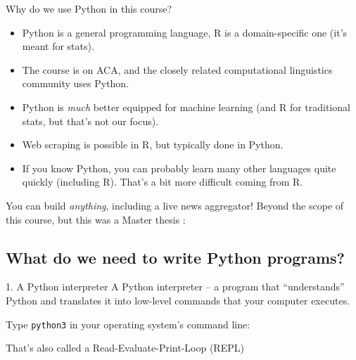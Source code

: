 \begin{frame}{Why do we use Python in this course?}
\begin{itemize}
	\item Python is a general programming language, R is a domain-specific one (it's meant for stats).
	\item The course is on ACA, and the closely related computational linguistics community uses Python.
	\item Python is \emph{much} better equipped for machine learning (and R for traditional stats, but that's not our focus).
	\item Web scraping is possible in R, but typically done in Python.
	\item If you know Python, you can probably learn many other languages quite quickly (including R). That's a bit more difficult coming from R.
\end{itemize}
	
\end{frame}



\begin{frame}{You can build \emph{anything}, including a live news aggregator!} 
	Beyond the scope of this course, but this was a Master thesis \parencite{3bij3}:
\end{frame}


\begin{frame}[plain]
\end{frame}

\subsection{What do we need to write Python programs?}

\begin{frame}{1. A Python interpreter}
A Python interpreter -- a program that ``understands'' Python and translates it into low-level commands that your computer executes.

Type \texttt{python3} in your operating system's command line:

That's also called a Read-Evaluate-Print-Loop (REPL)
\end{frame}

